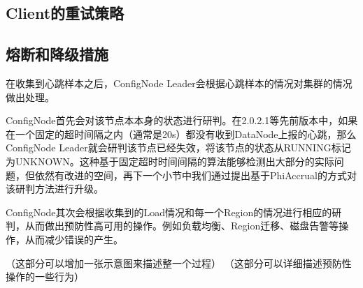 \subsection{Client的重试策略}






\subsection{熔断和降级措施}




在收集到心跳样本之后，ConfigNode Leader会根据心跳样本的情况对集群的情况做出处理。

ConfigNode首先会对该节点本本身的状态进行研判。在2.0.2.1等先前版本中，如果在一个固定的超时间隔之内（通常是20s）都没有收到DataNode上报的心跳，那么ConfigNode Leader就会研判该节点已经失效，将该节点的状态从RUNNING标记为UNKNOWN。这种基于固定超时时间间隔的算法能够检测出大部分的实际问题，但依然有改进的空间，再下一个小节中我们通过提出基于PhiAccrual的方式对该研判方法进行升级。

ConfigNode其次会根据收集到的Load情况和每一个Region的情况进行相应的研判，从而做出预防性高可用的操作。例如负载均衡、Region迁移、磁盘告警等操作，从而减少错误的产生。


（这部分可以增加一张示意图来描述整一个过程）
（这部分可以详细描述预防性操作的一些行为）